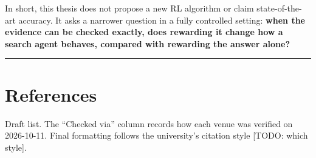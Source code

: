In short, this thesis does not propose a new RL algorithm or claim
state-of-the-art accuracy. It asks a narrower question in a fully
controlled setting: \textbf{when the evidence can be checked exactly,
does rewarding it change how a search agent behaves, compared with
rewarding the answer alone?}

\begin{center}\rule{0.5\linewidth}{0.5pt}\end{center}

\section{References}\label{references}

Draft list. The ``Checked via'' column records how each venue was
verified on 2026-10-11. Final formatting follows the university's
citation style {[}TODO: which style{]}.

